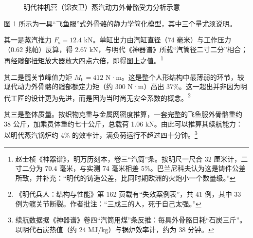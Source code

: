 \begin{figure}[htbp]
\caption{明代神机营（锦衣卫）蒸汽动力外骨骼受力分析示意}
\label{fig:exo}
\end{figure}

图 \ref{fig:exo} 所示为一具“飞鱼服”式外骨骼的静力学简化模型，其中三个量尤须说明。

其一是蒸汽推力 $F_{\mathrm{s}} = 12.4$ kN。单缸出力由汽缸直径（74 毫米）与工作压力（0.62 兆帕）反算，得 2.67 kN，与明代《神器谱》所载“汽筒径二寸二分”相合；再经髋部扭矩放大器放大四点六倍，即得图上之值。\footnote{赵士桢《神器谱》，明万历刻本，卷三“汽筒”条。按明尺一尺合 32 厘米计，二寸二分为 70.4 毫米，与实测 74 毫米相差 5\%。巴兰尼科夫认为这是铸件公差所致，并补充：“明代的铸造公差，比同时期欧洲的火炮小一个数量级。”}

其二是髋关节峰值力矩 $M_{\mathrm{h}} = 412$ N·m。这是整个人形结构中最薄弱的环节，较现代动力外骨骼的髋部额定力矩（约 300 N·m）高出 37\%。这一超出并非因为明代工匠的设计更为先进，而是因为当时尚无安全系数的概念。\footnote{《明代兵人：结构与性能》第 162 页载有“失效案例表”，共 41 例，其中 33 例为髋关节断裂。作者批注：“三成三的人，死于自己太强。”}

其三是整体质量。按织物克重与金属网密度推算，一套完整的飞鱼服外骨骼重约 38 公斤，加乘员体重约七十公斤，总载荷 1.06 kN。由此可以推算其续航能力：以明代蒸汽锅炉约 4\% 的效率计，满负荷运行不超过四十分钟。\footnote{续航数据据《神器谱》卷四“汽筒用煤”条反推：每具外骨骼日耗“石炭三斤”。以明代石炭热值（约 24 MJ/kg）与锅炉效率计，约为 38 分钟。}

